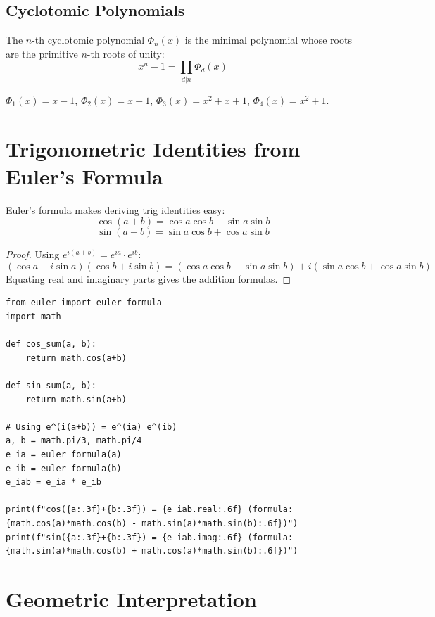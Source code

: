 \subsection{Cyclotomic Polynomials}

The $n$-th cyclotomic polynomial $\Phi_n(x)$ is the minimal polynomial whose roots are
the primitive $n$-th roots of unity:
\[
x^n - 1 = \prod_{d|n} \Phi_d(x)
\]

\begin{example}
$\Phi_1(x) = x - 1$, $\Phi_2(x) = x + 1$, $\Phi_3(x) = x^2 + x + 1$, $\Phi_4(x) = x^2 + 1$.
\end{example}

\section{Trigonometric Identities from Euler's Formula}

Euler's formula makes deriving trig identities easy:
\[
\cos(a+b) = \cos a \cos b - \sin a \sin b
\]
\[
\sin(a+b) = \sin a \cos b + \cos a \sin b
\]

\begin{proof}
Using $e^{i(a+b)} = e^{ia} \cdot e^{ib}$:
\[
(\cos a + i\sin a)(\cos b + i\sin b) = (\cos a \cos b - \sin a \sin b) + i(\sin a \cos b + \cos a \sin b)
\]
Equating real and imaginary parts gives the addition formulas.
\end{proof}

\begin{lstlisting}[caption={Deriving trig identities}, label=lst:trig_ids]
from euler import euler_formula
import math

def cos_sum(a, b):
    return math.cos(a+b)

def sin_sum(a, b):
    return math.sin(a+b)

# Using e^(i(a+b)) = e^(ia) e^(ib)
a, b = math.pi/3, math.pi/4
e_ia = euler_formula(a)
e_ib = euler_formula(b)
e_iab = e_ia * e_ib

print(f"cos({a:.3f}+{b:.3f}) = {e_iab.real:.6f} (formula: {math.cos(a)*math.cos(b) - math.sin(a)*math.sin(b):.6f})")
print(f"sin({a:.3f}+{b:.3f}) = {e_iab.imag:.6f} (formula: {math.sin(a)*math.cos(b) + math.cos(a)*math.sin(b):.6f})")
\end{lstlisting}

\section{Geometric Interpretation}

